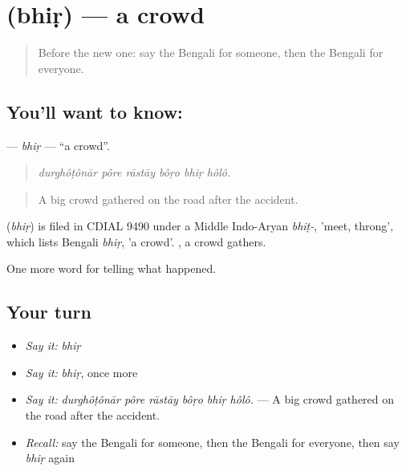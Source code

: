 \section[\texorpdfstring{\bn{ভিড়} (bhiṛ)}{ভিড় (bhiṛ)}]{ (bhiṛ) — a crowd}

\label{lesson:BN-C277-bhir}



\begin{quote}
Before the new one: say the Bengali for someone, then the Bengali for everyone.
\end{quote}

\subsection*{You'll want to know: }
\textbf{} — \emph{bhiṛ} — \textquotedblleft{}a crowd\textquotedblright{}.

\begin{quote}
     
\end{quote}

\begin{quote}
\emph{durghôṭônār pôre rāstāy bôṛo bhiṛ hôlô.}
\end{quote}

\begin{quote}
A big crowd gathered on the road after the accident.
\end{quote}

\begin{cousinweb}
\textbf{} (\emph{bhiṛ}) is filed in CDIAL 9490 under a Middle Indo-Aryan \emph{bhiṭ-}, 'meet, throng', which lists Bengali \emph{bhiṛ}, 'a crowd'.  , a crowd gathers.
\end{cousinweb}

\begin{grammarlens}[title={What you've built}]
One more word for telling what happened.
\end{grammarlens}

\subsection*{Your turn}
\begin{itemize}
\raggedright
  \item \emph{Say it:} \emph{bhiṛ}
  \item \emph{Say it:} \emph{bhiṛ}, once more
  \item \emph{Say it:} \emph{durghôṭônār pôre rāstāy bôṛo bhiṛ hôlô.} — A big crowd gathered on the road after the accident.
  \item \emph{Recall:} say the Bengali for someone, then the Bengali for everyone, then say \emph{bhiṛ} again
\end{itemize}


